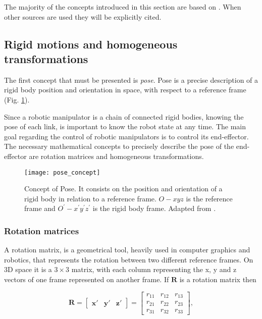 The majority of the concepts introduced in this section are based on \cite{Siciliano2009_robotics_modelling_planning_control}. When other sources are used they will be explicitly cited.

\subsection{Rigid motions and homogeneous transformations}
\label{subsec:rigid_motions_homogeneous_transformations}

The first concept that must be presented is \emph{pose}. Pose is a precise description of a rigid body position and orientation in space, with respect to a reference frame (Fig. \ref{fig:pose_concept}).  

Since a robotic manipulator is a chain of connected rigid bodies, knowing the pose of each link, is important to know the robot state at any time. The main goal regarding the control of robotic manipulators is to control its end-effector. The necessary mathematical concepts to precisely describe the pose of the end-effector are rotation matrices and homogeneous transformations.

\begin{figure}[htbp]
	\centering
	\texttt{[image: pose\_concept]}
	\caption{Concept of Pose. It consists on the position and orientation of a rigid body in relation to a reference frame. $O-xyz$ is the reference frame and $O^\prime-x^\prime y^\prime z^\prime$ is the rigid body frame. Adapted from \cite{Siciliano2009_robotics_modelling_planning_control}.}
	\label{fig:pose_concept}
\end{figure}

\subsubsection{Rotation matrices}
\label{subsubsec:rotation_matrices}

A rotation matrix, is a geometrical tool, heavily used in computer graphics and robotics, that represents the rotation between two different reference frames. On 3D space it is a $3\times3$ matrix, with each column representing the x, y and z vectors of one frame represented on another frame. If $\boldsymbol{R}$ is a rotation matrix then

\begin{equation}
    \boldsymbol{R} = \begin{bmatrix} \boldsymbol{x'} & \boldsymbol{y'} & \boldsymbol{z'}\end{bmatrix} = \begin{bmatrix} r_{11} & r_{12} & r_{13}\\
    r_{21} & r_{22} & r_{23}\\
    r_{31} & r_{32} & r_{33}\end{bmatrix},
\end{equation}

